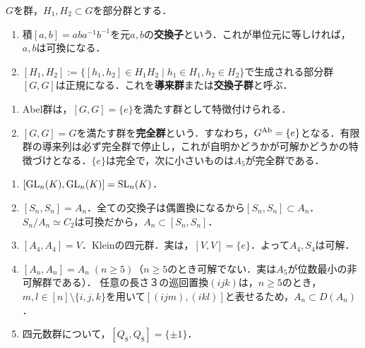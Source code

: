 \documentclass[uplatex,dvipdfmx]{jsreport}
\begin{document}
\begin{definition}
    $G$を群，$H_1,H_2\subset G$を部分群とする．
    \begin{enumerate}
        \item 積$[a,b]=aba^{-1}b^{-1}$を元$a,b$の\textbf{交換子}という．これが単位元に等しければ，$a,b$は可換になる．
        \item $[H_1,H_2]:=\{[h_1,h_2]\in H_1H_2\mid h_1\in H_1,h_2\in H_2\}$で生成される部分群$[G,G]$は正規になる．これを\textbf{導来群}または\textbf{交換子群}と呼ぶ．
    \end{enumerate}
\end{definition}
\begin{remark}\mbox{}
    \begin{enumerate}
        \item Abel群は，$[G,G]=\{e\}$を満たす群として特徴付けられる．
        \item $[G,G]=G$を満たす群を\textbf{完全群}という．すなわち，$G^{\mathrm{Ab}}=\{e\}$となる．有限群の導来列は必ず完全群で停止し，これが自明かどうかが可解かどうかの特徴づけとなる．$\{e\}$は完全で，次に小さいものは$A_5$が完全群である．
    \end{enumerate}
\end{remark}
\begin{example}[交換子部分群の例]\mbox{}\label{exp-commutator-subgroup}
    \begin{enumerate}
        \item $[\mathrm{GL}_n(K),\mathrm{GL}_n(K)]=\mathrm{SL}_n(K)$．
        \item $[S_n,S_n]=A_n$．全ての交換子は偶置換になるから$[S_n,S_n]\subset A_n$．$S_n/A_n\simeq C_2$は可換だから，$A_n\subset[S_n,S_n]$．
        \item $[A_4,A_4]=V$．Kleinの四元群．実は，$[V,V]=\{e\}$．よって$A_4,S_4$は可解．
        \item $[A_n,A_n]=A_n\;(n\ge 5)$（$n\ge 5$のとき可解でない．実は$A_5$が位数最小の非可解群である）．
        任意の長さ３の巡回置換$(ijk)$は，$n\ge 5$のとき，$m,l\in [n]\setminus\{i,j,k\}$を用いて$[(ijm),(ikl)]$と表せるため，$A_n\subset D(A_n)$．
        \item 四元数群について，$[Q_8,Q_8]=\{\pm 1\}$．
    \end{enumerate}
\end{example}
\end{document}
